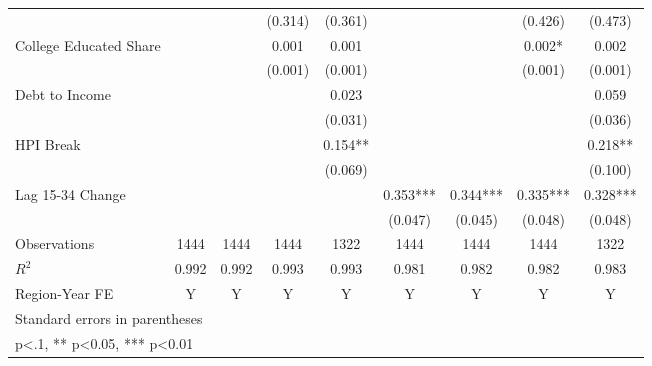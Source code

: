 \begin{table}[htbp]
\begin{tabular}{l*{8}{c}}
                    &            &            &  (0.314)   &  (0.361)   &            &            &  (0.426)   &  (0.473)   \\
\addlinespace
College Educated Share&            &            &    0.001   &    0.001   &            &            &    0.002*  &    0.002   \\
                    &            &            &  (0.001)   &  (0.001)   &            &            &  (0.001)   &  (0.001)   \\
\addlinespace
Debt to Income      &            &            &            &    0.023   &            &            &            &    0.059   \\
                    &            &            &            &  (0.031)   &            &            &            &  (0.036)   \\
\addlinespace
HPI Break           &            &            &            &    0.154** &            &            &            &    0.218** \\
                    &            &            &            &  (0.069)   &            &            &            &  (0.100)   \\
\addlinespace
Lag 15-34 Change    &            &            &            &            &    0.353***&    0.344***&    0.335***&    0.328***\\
                    &            &            &            &            &  (0.047)   &  (0.045)   &  (0.048)   &  (0.048)   \\
\midrule
Observations        &     1444   &     1444   &     1444   &     1322   &     1444   &     1444   &     1444   &     1322   \\
\(R^{2}\)           &    0.992   &    0.992   &    0.993   &    0.993   &    0.981   &    0.982   &    0.982   &    0.983   \\
Region-Year FE      &        Y   &        Y   &        Y   &        Y   &        Y   &        Y   &        Y   &        Y   \\
\bottomrule
\multicolumn{9}{l}{\footnotesize Standard errors in parentheses}\\
\multicolumn{9}{l}{\footnotesize * p<.1, ** p<0.05, *** p<0.01}\\
\end{tabular}
\end{table}

